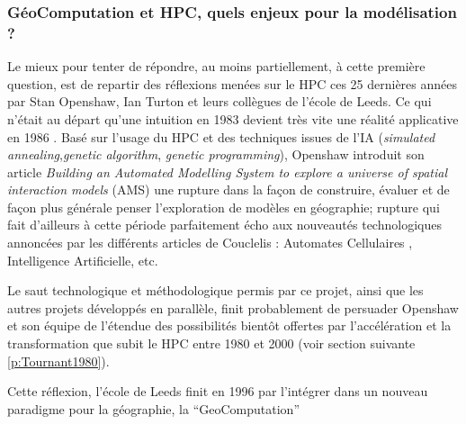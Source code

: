 \subsubsection{GéoComputation et HPC, quels enjeux pour la modélisation ? }
\label{sssec:enjeuxHPC}

Le mieux pour tenter de répondre, au moins partiellement, à cette première question, est de repartir des réflexions menées sur le HPC ces 25 dernières années par Stan Openshaw, Ian Turton et leurs collègues de l'école de Leeds. Ce qui n'était au départ qu'une intuition en 1983  devient très vite une réalité applicative en 1986 \autocite{Openshaw1988}. Basé sur l'usage du HPC et des techniques issues de l'IA (\textit{simulated annealing},\textit{genetic algorithm}, \textit{genetic programming}), Openshaw introduit son article \textit{Building an Automated Modelling System to explore a universe of spatial interaction models} (AMS) une rupture dans la façon de construire, évaluer et de façon plus générale penser l'exploration de modèles en géographie; rupture qui fait d'ailleurs à cette période parfaitement écho aux nouveautés technologiques annoncées par les différents articles de Couclelis : Automates Cellulaires \autocite{Couclelis1985}, Intelligence Artificielle, etc. \autocite{Couclelis1986}

Le saut technologique et méthodologique permis par ce projet, ainsi que les autres projets développés en parallèle, finit probablement de persuader Openshaw et son équipe de l'étendue des possibilités bientôt offertes par l'accélération et la transformation que subit le HPC entre 1980 et 2000 (voir section suivante \ref{p:Tournant1980}).

Cette réflexion, l'école de Leeds finit en 1996 par l'intégrer dans un nouveau paradigme pour la géographie, la \foreignquote{english}{GeoComputation}

